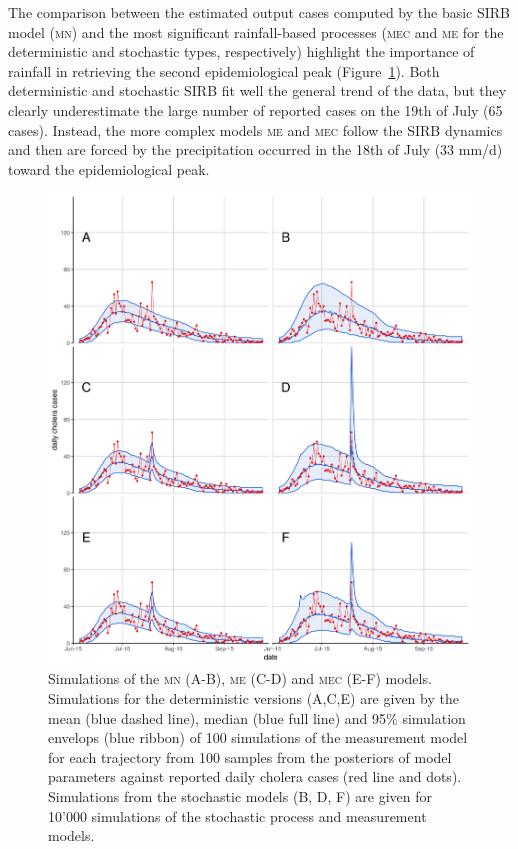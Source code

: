 The comparison between the estimated output cases computed by the basic SIRB model (\textsc{mn}) and the most significant rainfall-based processes (\textsc{mec} and \textsc{me} for the deterministic and stochastic types, respectively) highlight the importance of rainfall in retrieving the second epidemiological peak (Figure~\ref{fig:sim}). Both deterministic and stochastic SIRB fit well the general trend of the data, but they clearly underestimate the large number of reported cases on the 19th of July (65 cases). Instead, the more complex models \textsc{me} and \textsc{mec} follow the SIRB dynamics and then are forced by the precipitation occurred in the 18th of July (33 mm/d)  toward the epidemiological peak. 
%
\begin{figure}[ht]
    \centering
    \includegraphics{fig_cholera-rainfall/Lemaitre_ACTROP_2018_42_R1_fig4.png}
    \caption[Fit of the different models]{Simulations of the \textsc{mn} (A-B), \textsc{me} (C-D) and \textsc{mec} (E-F) models. Simulations for the deterministic versions (A,C,E) are given by the mean (blue dashed line), median (blue full line) and 95\% simulation envelops (blue ribbon) of 100 simulations of the measurement model for each trajectory from 100 samples from the posteriors of model parameters against reported daily cholera cases (red line and dots). Simulations from the stochastic models (B, D, F) are given for 10'000 simulations of the stochastic process and measurement models.}
    \label{fig:sim}
\end{figure}

